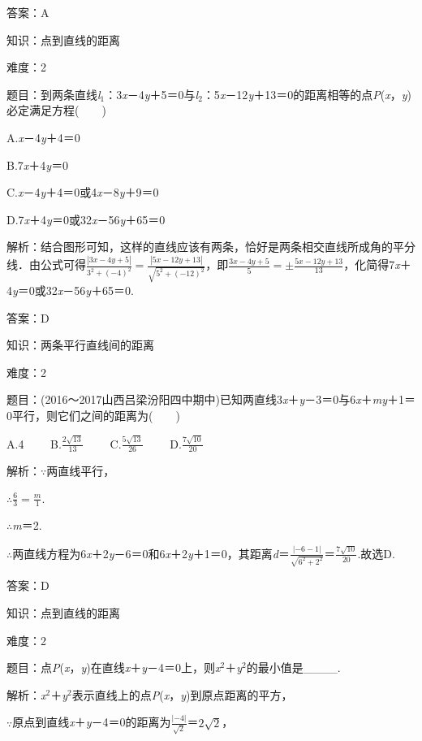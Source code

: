 \documentclass{article} %
\begin{document}
答案：A

知识：点到直线的距离

难度：2

题目：到两条直线\textit{l}${}_{1}$：3\textit{x}－4\textit{y}＋5＝0与\textit{l}${}_{2}$：5\textit{x}－12\textit{y}＋13＝0的距离相等的点\textit{P}(\textit{x}，\textit{y})必定满足方程(　　)

A.\textit{x}－4\textit{y}＋4＝0

B.7\textit{x}＋4\textit{y}＝0

C.\textit{x}－4\textit{y}＋4＝0或4\textit{x}－8\textit{y}＋9＝0

D.7\textit{x}＋4\textit{y}＝0或32\textit{x}－56\textit{y}＋65＝0

解析：结合图形可知，这样的直线应该有两条，恰好是两条相交直线所成角的平分线．由公式可得$\frac{|3x-4y+5|}{3^2+(-4)^2}=\frac{|5x-12y+13|}{\sqrt{5^2+(-12)^2}}$，即$\frac{3x-4y+5}{5}=\mathrm{\pm}\frac{5x-12y+13}{13}$，化简得7\textit{x}＋4\textit{y}＝0或32\textit{x}－56\textit{y}＋65＝0.

答案：D

知识：两条平行直线间的距离

难度：2

题目：(2016～2017山西吕梁汾阳四中期中)已知两直线3\textit{x}＋\textit{y}－3＝0与6\textit{x}＋\textit{my}＋1＝0平行，则它们之间的距离为(　　)

A.4　　 B.$\frac{2\sqrt{13}}{13}$　　 C.$\frac{5\sqrt{13}}{26}$　　 D.$\frac{7\sqrt{10}}{20}$

解析：$\mathrm{\because}$两直线平行，

$\mathrm{\therefore}\frac{6}{3}=\frac{m}{1}$.

$\mathrm{\therefore}$\textit{m}＝2.

$\mathrm{\therefore}$两直线方程为6\textit{x}＋2\textit{y}－6＝0和6\textit{x}＋2\textit{y}＋1＝0，其距离\textit{d}＝$\frac{|-6-1|}{\sqrt{6^2+2^2}}$＝$\frac{7\sqrt{10}}{20}$.故选D.

答案：D

知识：点到直线的距离

难度：2

题目：点\textit{P}(\textit{x}，\textit{y})在直线\textit{x}＋\textit{y}－4＝0上，则\textit{x}${}^{2}$＋\textit{y}${}^{2}$的最小值是\_\_\_\_.

解析：\textit{x}${}^{2}$＋\textit{y}${}^{2}$表示直线上的点\textit{P}(\textit{x}，\textit{y})到原点距离的平方，

$\mathrm{\because}$原点到直线\textit{x}＋\textit{y}－4＝0的距离为$\frac{|-4|}{\sqrt{2}}$＝$2\sqrt{2}$，
\end{document}

